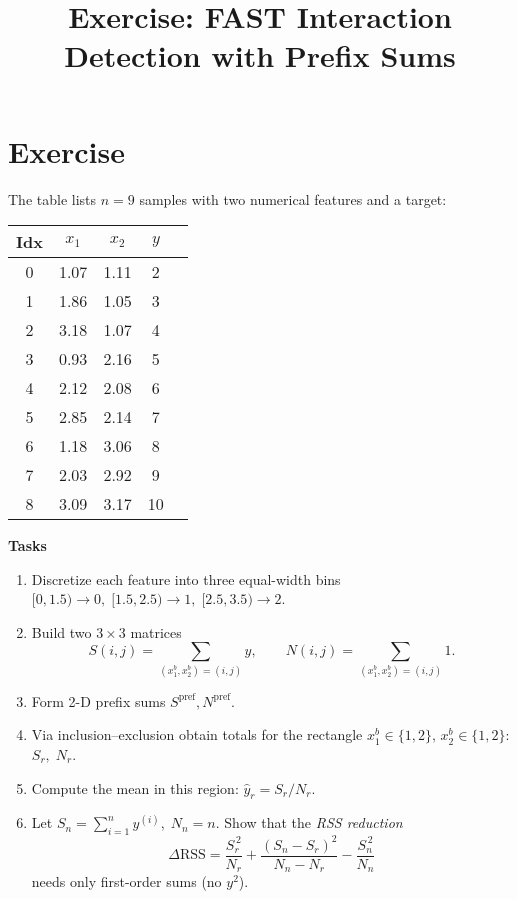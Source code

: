 \documentclass{article}
\title{Exercise: FAST Interaction Detection with Prefix Sums}
\date{}
\begin{document}
\author{}
\maketitle

\section*{Exercise}
The table lists \(n=9\) samples with two numerical features and a target:

\begin{center}
\begin{tabular}{ccccc}
\toprule
Idx & $x_1$ & $x_2$ & $y$ \\ \midrule
0 & 1.07 & 1.11 &  2 \\
1 & 1.86 & 1.05 &  3\\
2 & 3.18 & 1.07 &  4 \\
3 & 0.93 & 2.16 &  5 \\
4 & 2.12 & 2.08 &  6 \\
5 & 2.85 & 2.14 &  7 \\
6 & 1.18 & 3.06 &  8 \\
7 & 2.03 & 2.92 &  9 \\
8 & 3.09 & 3.17 & 10 \\ \bottomrule
\end{tabular}

\end{center}

\bigskip
\textbf{Tasks}
\begin{enumerate}
\item Discretize each feature into three equal-width bins  
      \([0,1.5)\!\to\!0,\;[1.5,2.5)\!\to\!1,\;[2.5,3.5)\!\to\!2\).

\item Build two \(3\times3\) matrices
      \[
        S(i,j)=\!\!\sum_{(x_1^b,x_2^b)=(i,j)} \! y,
        \qquad
        N(i,j)=\!\!\sum_{(x_1^b,x_2^b)=(i,j)} \! 1 .
      \]

\item Form 2-D prefix sums
      \(S^{\mathrm{pref}},N^{\mathrm{pref}}\).

\item Via inclusion–exclusion obtain totals for the rectangle  
      \(x_1^b\!\in\!\{1,2\},\,x_2^b\!\in\!\{1,2\}\):  
      \(S_r,\;N_r\).

\item Compute the mean in this region:
      \(\hat y_r = S_r/N_r\).

\item Let \(S_n=\sum_{i=1}^n y^{(i)},\;N_n=n\).  
      Show that the \emph{RSS reduction}
      \[
        \Delta\text{RSS}
          = \frac{S_r^{\,2}}{N_r}
            +\frac{(S_n-S_r)^{2}}{N_n-N_r}
            -\frac{S_n^{\,2}}{N_n}
      \]
      needs only first-order sums (no \(y^2\)).
\end{enumerate}
\end{document}
